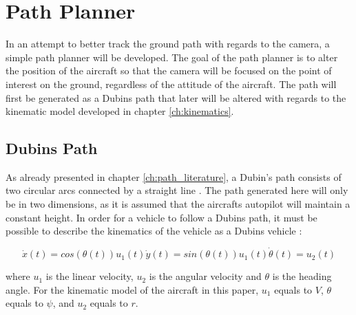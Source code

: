 \section{Path Planner}

In an attempt to better track the ground path with regards to the camera, a simple path planner will be developed. The goal of the path planner is to alter the position of the aircraft so that the camera will be focused on the point of interest on the ground, regardless of the attitude of the aircraft. The path will first be generated as a Dubins path that later will be altered with regards to the kinematic model developed in chapter \ref{ch:kinematics}.


\subsection{Dubins Path}
\label{ch:dubins_path}

As already presented in chapter \ref{ch:path_literature}, a Dubin's path consists of two circular arcs connected by a straight line \cite{DUBIN}. The path generated here will only be in two dimensions, as it is assumed that the aircrafts autopilot will maintain a constant height. In order for a vehicle to follow a Dubins path, it must be possible to describe the kinematics of the vehicle as a Dubins vehicle \cite{dubinYONG}:

\begin{subequations}
\begin{equation}
	\dot{x}(t) = cos(\theta(t))u_1(t)
\end{equation}
\begin{equation}
	\dot{y}(t) = sin(\theta(t))u_1(t)
\end{equation}
\begin{equation}
	\dot{\theta}(t) = u_2(t)
\end{equation}
\end{subequations}

where $u_1$ is the linear velocity, $u_2$ is the angular velocity and $\theta$ is the heading angle. For the kinematic model of the aircraft in this paper, $u_1$ equals to $V$, $\theta$ equals to $\psi$, and $u_2$ equals to $r$.


